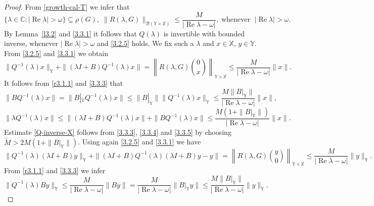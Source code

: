 \documentclass[11pt]{amsart}
\numberwithin{equation}{section}
\theoremstyle{remark}
\theoremstyle{definition}
\newcommand\bX{{\mathbb X}}
\newcommand\bY{{\mathbb Y}}
\begin{document}
\begin{proof}
	From \eqref{growth-cal-T} we infer that
	\begin{equation}\label{3.3.1}
		\{\lambda \in \mathbb{C} : |\operatorname{Re}\lambda| > \omega\} \subseteq \rho(G),\; 
		\|R(\lambda, G)\|_{\mathcal{B}(\bY\times\bX)} \leq \frac{M}{|\operatorname{Re}\lambda - \omega|},
		\;\text{whenever }\; |\operatorname{Re}\lambda| > \omega.
	\end{equation}
	By Lemma~\ref{l3.2} and \eqref{3.3.1} it follows that $Q(\lambda)$ is invertible with bounded inverse, whenever $|\operatorname{Re}\lambda| > \omega$ and \eqref{3.2.5} holds. We fix such a $\lambda$ and $x \in \bX$, $y \in \bY$. From \eqref{3.2.5} and \eqref{3.3.1} we obtain 
	\begin{equation}\label{3.3.3}
		\|Q^{-1}(\lambda)x\|_\bY + \|(\lambda I+B)Q^{-1}(\lambda)x\|
		= \left\|R(\lambda,G)\binom{0}{x}\right\|_{\bY\times\bX}
		\leq \frac{M}{|\operatorname{Re}\lambda - \omega|}\|x\|. 
	\end{equation}
It follows from \eqref{r3.1.1} and \eqref{3.3.3} that
	\begin{equation}\label{3.3.4}
		\|BQ^{-1}(\lambda)x\|
		= \|B|_\bY Q^{-1}(\lambda)x\| \leq \|B|_\bY\|\|Q^{-1}(\lambda)x\|_\bY
		\leq \frac{M\|B|_\bY\|}{|\operatorname{Re}\lambda - \omega|}\|x\|,
	\end{equation}
	\begin{equation}\label{3.3.5}
		\|\lambda Q^{-1}(\lambda)x\|
		\leq \|(\lambda I+B)Q^{-1}(\lambda)x\| + \|BQ^{-1}(\lambda)x\|
		\leq \frac{M(1+\|B|_\bY\|)}{|\operatorname{Re}\lambda - \omega|}\|x\|.
	\end{equation}
	Estimate \eqref{Q-inverse-X} follows from \eqref{3.3.3}, \eqref{3.3.4} and \eqref{3.3.5} by choosing $\widetilde{M}>2M(1+\|B|_\bY\|)$. Using again \eqref{3.2.5} and \eqref{3.3.1} we have 
	\begin{equation}\label{3.3.6}
		\|Q^{-1}(\lambda)(\lambda I+B)y\|_\bY + \|(\lambda I+B)Q^{-1}(\lambda)(\lambda I+B)y - y\|
		= \left\|R(\lambda,G)\binom{y}{0}\right\|_{\bY\times \bX}
		\leq \frac{M}{|\operatorname{Re}\lambda - \omega|}\|y\|_\bY. 
	\end{equation}
	From \eqref{r3.1.1} and \eqref{3.3.3} we infer 
	\begin{equation}\label{3.3.7}
		\|Q^{-1}(\lambda)By\|_\bY \leq \frac{M}{|\operatorname{Re}\lambda - \omega|}\|By\|
		= \frac{M}{|\operatorname{Re}\lambda - \omega|}\|B|_\bY y\|
		\leq \frac{M\|B|_\bY\|}{|\operatorname{Re}\lambda - \omega|}\|y\|_\bY.
	\end{equation}

\end{proof}
\end{document}
